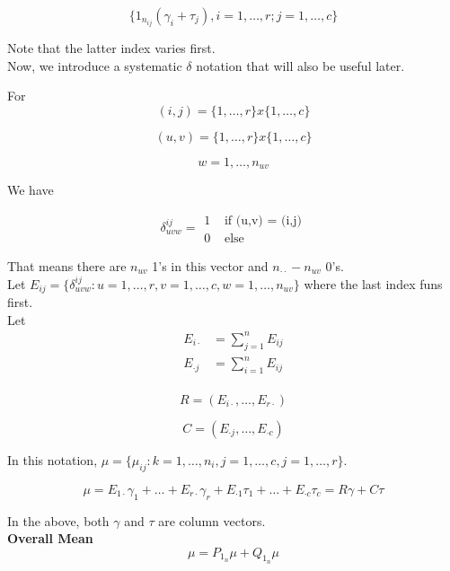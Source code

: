 \documentclass[11pt,fleqn]{book} %
\begin{document}
			$$\{1_{n_{ij}} (\gamma_i  + \tau_j), i = 1, \dots, r; j = 1, \dots, c \} $$

Note that the latter index varies first. \\

Now, we introduce a systematic $\delta$ notation that will also be useful later. 


\begin{notation}
	For 
			$$(i,j) = \{1, \dots, r \} x \{1, \dots, c \} $$

			$$(u,v) = \{1, \dots, r \} x \{1, \dots, c \} $$

			$$w = 1, \dots, n_{uv} $$


	We have

		    $$\delta^{ij}_{uvw} =  \begin{array}{ll}
		    	1 & \text{ if (u,v) = (i,j)} \\
		    	0 & \text{ else}
		    \end{array}$$

\end{notation}

That means there are $n_{uv}$ 1's in this vector and $n_{\cdot \cdot} - n_{uv}$ 0's. \\

Let $E_{ij} = \{\delta^{ij}_{uvw}: u = 1, \dots, r, v = 1, \dots, c, w = 1, \dots, n_{uv}  \}$ where the last index funs first. \\

Let 	
		\begin{align}
			E_{i\cdot} &= \sum^n_{j=1} E_{ij}\\
			E_{\cdot j} &= \sum^n_{i=1} E_{ij}\\
		\end{align}


			$$R = \left(E_{i \cdot}, \dots, E_{r \cdot} \right) $$

			$$C = \left(E_{ \cdot j}, \dots, E_{\cdot c} \right) $$

In this notation, $\mu = \{\mu_{ij}: k = 1, \dots, n_i, j = 1, \dots, c, j = 1, \dots, r \}$. 

		$$\mu = E_{1\cdot} \gamma_1 + \dots + E_{r \cdot}\gamma_r + E_{\cdot 1} \tau_1 + \dots + E_{ \cdot c}\tau_c = R\gamma + C\tau $$

In the above, both $\gamma$ and $\tau$ are column vectors. \\

\textbf{Overall Mean}\\

		$$\mu = P_{1_n} \mu + Q_{1_n}\mu $$
\end{document}
